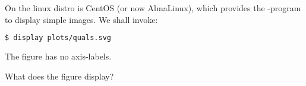 \begin{frame}[fragile]
  \frametitle{}
  On \mogon{} the linux distro is CentOS (or now AlmaLinux), which provides the -program to display simple images. We shall invoke:
  \begin{lstlisting}[language=Bash, style=Shell]
$ display plots/quals.svg
  \end{lstlisting}
  The figure has no axis-labels.
  \begin{question}
  	What does the figure display?
  \end{question}
\end{frame}
